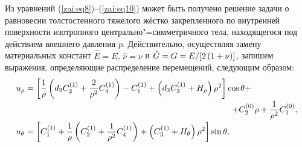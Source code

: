  Из уравнений (\ref{zai:eq8})--(\ref{zai:eq10}) может быть получено решение задачи о
равновесии толстостенного тяжелого жёстко закрепленного по
внутренней поверхности изотропного центрально"=симметричного тела,
находящегося под действием внешнего давления $p$. Действительно,
осуществляя замену материальных констант $\hat {E} = E$, $\hat {\nu
} = \nu $ и $\hat {G} = G = E \mathord{\left/ {\vphantom {E {\left[
{2\left( {1 + \nu } \right)} \right]}}} \right.
\kern-\nulldelimiterspace} {\left[ {2\left( {1 + \nu } \right)}
\right]}$, запишем выражения, определяющие распределение перемещений, следующим образом:
\begin{equation}
\label{zai:eq11} 
\begin{array}{l}
\displaystyle
u_\rho = \left[ {\frac{1}{\rho }\left( {d_2 C_2^{\left(
1 \right)} + \frac{2}{\rho ^2}C_4^{(1)} } \right) -
C_1^{(1)} + \left( {d_3 C_3^{(1)} + H_\rho
} \right)\rho ^2} \right] \cos \theta + \vspace{1mm} \\
\displaystyle \hspace{9cm}
 + C_2^{(0)} \rho + \frac{1}{\rho ^2}C_1^{(0)} , \vspace{1mm}\\
 \displaystyle
u_\theta = \left[ {C_1^{(1)} + \frac{1}{\rho }\left(
{C_2^{(1)} + \frac{1}{\rho ^2}C_4^{(1)} }
\right) + \left( {C_3^{(1)} + H_\theta } \right)\rho
^2} \right] \sin \theta .
\end{array}
\end{equation}

